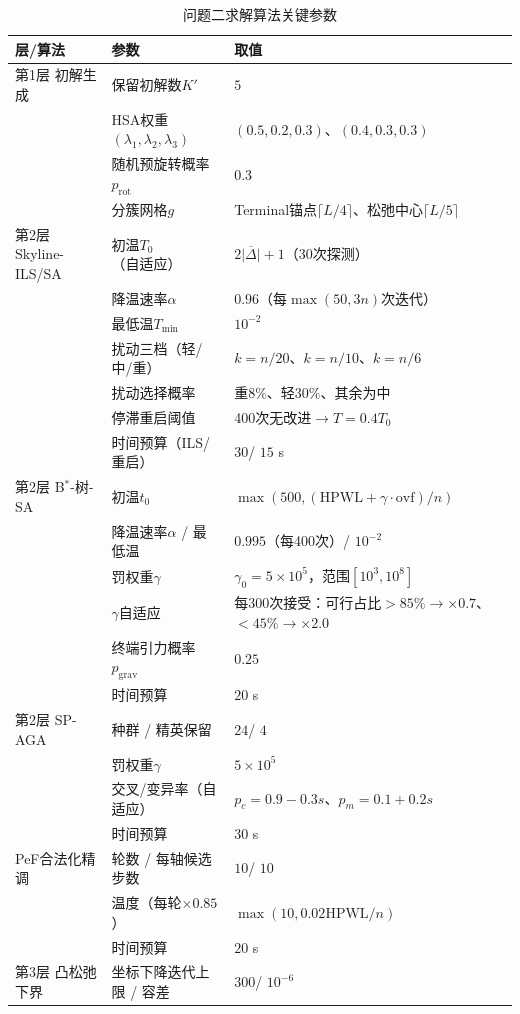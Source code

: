 \documentclass{JXUSTmodeling}
\begin{document}
\begin{table}[!htbp]
	\centering
	\small
	\caption{\label{tab:p2_params}问题二求解算法关键参数}
	\begin{tabularx}{\textwidth}{@{}lXX@{}}
		\toprule[1.5pt]
		层/算法&参数&取值\\
		\midrule
		第1层 初解生成&保留初解数$K'$&$5$\\
		&HSA权重$(\lambda_1,\lambda_2,\lambda_3)$&$(0.5,0.2,0.3)$、$(0.4,0.3,0.3)$\\
		&随机预旋转概率$p_{\mathrm{rot}}$&$0.3$\\
		&分簇网格$g$&Terminal锚点$\lceil L/4\rceil$、松弛中心$\lceil L/5\rceil$\\
		第2层 Skyline-ILS/SA&初温$T_0$（自适应）&$2\overline{|\Delta|}+1$（30次探测）\\
		&降温速率$\alpha$&$0.96$（每$\max(50,3n)$次迭代）\\
		&最低温$T_{\min}$&$10^{-2}$\\
		&扰动三档（轻/中/重）&$k{=}n/20$、$k{=}n/10$、$k{=}n/6$\\
		&扰动选择概率&重$8\%$、轻$30\%$、其余为中\\
		&停滞重启阈值&400次无改进$\to T{=}0.4T_0$\\
		&时间预算（ILS/重启）&$30$/ $15$ s\\
		第2层 B$^{\ast}$-树-SA&初温$t_0$&$\max(500,(\mathrm{HPWL}+\gamma\cdot\mathrm{ovf})/n)$\\
		&降温速率$\alpha$ / 最低温&$0.995$（每400次）/ $10^{-2}$\\
		&罚权重$\gamma$&$\gamma_0{=}5\times10^{5}$，范围$[10^{3},10^{8}]$\\
		&$\gamma$自适应&每300次接受：可行占比$>85\%\to\times0.7$、$<45\%\to\times2.0$\\
		&终端引力概率$p_{\mathrm{grav}}$&$0.25$\\
		&时间预算&$20$ s\\
		第2层 SP-AGA&种群 / 精英保留&$24$/ $4$\\
		&罚权重$\gamma$&$5\times10^{5}$\\
		&交叉/变异率（自适应）&$p_c{=}0.9-0.3s$、$p_m{=}0.1+0.2s$\\
		&时间预算&$30$ s\\
		PeF合法化精调&轮数 / 每轴候选步数&$10$/ $10$\\
		&温度（每轮$\times0.85$）&$\max(10,0.02\mathrm{HPWL}/n)$\\
		&时间预算&$20$ s\\
		第3层 凸松弛下界&坐标下降迭代上限 / 容差&$300$/ $10^{-6}$\\
		\bottomrule[1.5pt]
	\end{tabularx}
\end{table}
\end{document}
